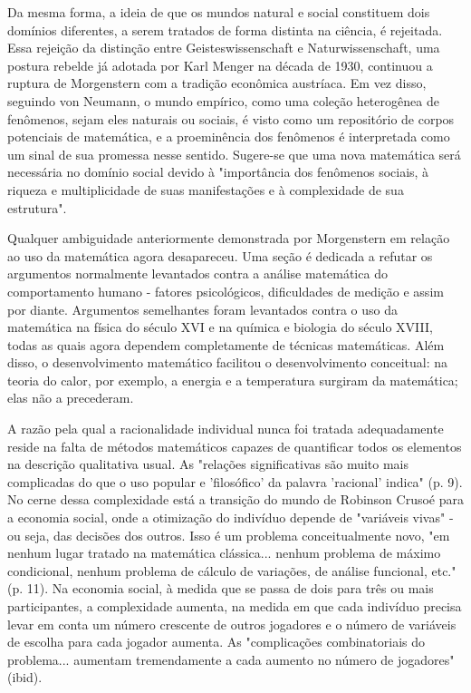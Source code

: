 \documentclass[a4paper,12pt]{article}[abntex2]
\begin{document}
Da mesma forma, a ideia de que os mundos natural e social constituem dois domínios diferentes, a serem tratados de forma distinta na ciência, é rejeitada. Essa rejeição da distinção entre Geisteswissenschaft e Naturwissenschaft, uma postura rebelde já adotada por Karl Menger na década de 1930, continuou a ruptura de Morgenstern com a tradição econômica austríaca. Em vez disso, seguindo von Neumann, o mundo empírico, como uma coleção heterogênea de fenômenos, sejam eles naturais ou sociais, é visto como um repositório de corpos potenciais de matemática, e a proeminência dos fenômenos é interpretada como um sinal de sua promessa nesse sentido. Sugere-se que uma nova matemática será necessária no domínio social devido à "importância dos fenômenos sociais, à riqueza e multiplicidade de suas manifestações e à complexidade de sua estrutura".

Qualquer ambiguidade anteriormente demonstrada por Morgenstern em relação ao uso da matemática agora desapareceu. Uma seção é dedicada a refutar os argumentos normalmente levantados contra a análise matemática do comportamento humano - fatores psicológicos, dificuldades de medição e assim por diante. Argumentos semelhantes foram levantados contra o uso da matemática na física do século XVI e na química e biologia do século XVIII, todas as quais agora dependem completamente de técnicas matemáticas. Além disso, o desenvolvimento matemático facilitou o desenvolvimento conceitual: na teoria do calor, por exemplo, a energia e a temperatura surgiram da matemática; elas não a precederam.

A razão pela qual a racionalidade individual nunca foi tratada adequadamente reside na falta de métodos matemáticos capazes de quantificar todos os elementos na descrição qualitativa usual. As "relações significativas são muito mais complicadas do que o uso popular e 'filosófico' da palavra 'racional' indica" (p. 9). No cerne dessa complexidade está a transição do mundo de Robinson Crusoé para a economia social, onde a otimização do indivíduo depende de "variáveis vivas" - ou seja, das decisões dos outros. Isso é um problema conceitualmente novo, "em nenhum lugar tratado na matemática clássica... nenhum problema de máximo condicional, nenhum problema de cálculo de variações, de análise funcional, etc." (p. 11). Na economia social, à medida que se passa de dois para três ou mais participantes, a complexidade aumenta, na medida em que cada indivíduo precisa levar em conta um número crescente de outros jogadores e o número de variáveis de escolha para cada jogador aumenta. As "complicações combinatoriais do problema... aumentam tremendamente a cada aumento no número de jogadores" (ibid).
\end{document}
